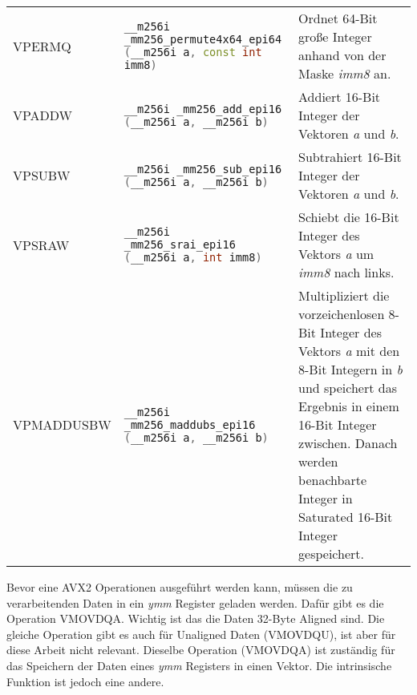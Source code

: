 \begin{table}[ht]
\begin{footnotesize}
\begin{tabularx}{\textwidth}{l X X}
      VPERMQ          & \lstinline[language=C++]{__m256i _mm256_permute4x64_epi64 (__m256i a, const int imm8)}    & Ordnet 64-Bit große Integer anhand von der Maske \emph{imm8} an.                                                                                                                                                                                              \\
      VPADDW          & \lstinline[language=C++]{__m256i _mm256_add_epi16 (__m256i a, __m256i b)}    & Addiert 16-Bit Integer der Vektoren \emph{a} und \emph{b}.                                                                                                                                                                                       \\
      VPSUBW          & \lstinline[language=C++]{__m256i _mm256_sub_epi16 (__m256i a, __m256i b)}    & Subtrahiert 16-Bit Integer der Vektoren \emph{a} und \emph{b}.                                                                                                                                                                                      \\
      VPSRAW          & \lstinline[language=C++]{__m256i _mm256_srai_epi16 (__m256i a, int imm8)}    & Schiebt die 16-Bit Integer des Vektors \emph{a} um \emph{imm8} nach links.                                                                                                                                                                         \\
      VPMADDUSBW      & \lstinline[language=C++]{__m256i _mm256_maddubs_epi16 (__m256i a, __m256i b)}    & Multipliziert die vorzeichenlosen 8-Bit Integer des Vektors \emph{a} mit den 8-Bit Integern in \emph{b} und speichert das Ergebnis in einem 16-Bit Integer zwischen. Danach werden benachbarte Integer in Saturated 16-Bit Integer gespeichert.                         \\
      \bottomrule
    \end{tabularx}
  \end{footnotesize}
  \rmfamily
\end{table}

Bevor eine \ac{AVX2} Operationen ausgeführt werden kann, müssen die zu verarbeitenden Daten in ein \emph{ymm} Register geladen werden. Dafür gibt es die Operation VMOVDQA. Wichtig ist das die Daten 32-Byte Aligned sind. Die gleiche Operation gibt es auch für Unaligned Daten (VMOVDQU), ist aber für diese Arbeit nicht relevant. Dieselbe Operation (VMOVDQA) ist zuständig für das Speichern der Daten eines \emph{ymm} Registers in einen Vektor. Die intrinsische Funktion ist jedoch eine andere.

